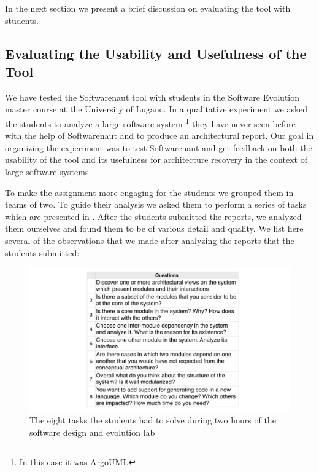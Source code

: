\documentclass[preprint,12pt]{elsarticle}
\begin{document}
In the next section we present a brief discussion on evaluating the tool with students.

\subsection {Evaluating the Usability and Usefulness of the Tool}
We have tested the Softwarenaut tool with students in the Software Evolution master course at the University of Lugano. In a qualitative experiment we asked the students to analyze a large software system \footnote{In this case it was ArgoUML} they have never seen before with the help of Softwarenaut and to produce an architectural report. Our goal in organizing the experiment was to test Softwarenaut and get feedback on both the usability of the tool and its usefulness for architecture recovery in the context of large software systems. 



To make the assignment more engaging for the students we grouped them in teams of two. To guide their analysis we asked them to perform a series of tasks which are presented in . After the students submitted the reports, we analyzed them ourselves and found them to be of various detail and quality. We list here several of the observations that we made after analyzing the reports that the students submitted:

\begin{figure}[t]
\begin{center}
\includegraphics[width=\linewidth]{tasks}
\caption{The eight tasks the students had to solve during two hours of the software design and evolution lab}
\end{center}
\end{figure}
\end{document}
